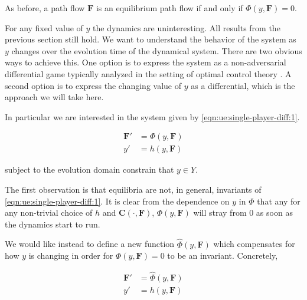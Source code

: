 As before, a path flow $\mathbf{F}$ is an equilibrium path flow if and only if $\Phi(y, \mathbf{F}) = 0$.

For any fixed value of $y$ the dynamics are uninteresting.
All results from the previous section still hold.
We want to understand the behavior of the system as $y$ changes over the evolution time of the dynamical system.
There are two obvious ways to achieve this.
One option is to express the system as a non-adversarial differential game typically analyzed in the setting of optimal control theory \citep{bardi2008optimal}.
A second option is to express the changing value of $y$ as a differential, which is the approach we will take here.

In particular we are interested in the system given by \eqref{eqn:ue:single-player-diff:1}.

\begin{subequations}
    \begin{align}
        \mathbf{F}' &= \Phi(y, \mathbf{F})\\ 
        y' &= h(y, \mathbf{F})
    \end{align}\label{eqn:ue:single-player-diff:1}
\end{subequations}

subject to the evolution domain constrain that $y\in Y$.

The first observation is that equilibria are not, in general, invariants of \eqref{eqn:ue:single-player-diff:1}.
It is clear from the dependence on $y$ in $\Phi$ that any for any non-trivial choice of $h$ and $\mathbf{C}(\cdot, \mathbf{F})$, $\Phi(y, \mathbf{F})$ will stray from 0 as soon as the dynamics start to run.

We would like instead to define a new function $\hat{\Phi}(y, \mathbf{F})$ which compensates for how $y$ is changing in order for $\Phi(y, \mathbf{F}) = 0$ to be an invariant. Concretely,

\begin{subequations}
    \begin{align}
        \mathbf{F}' &= \hat{\Phi}(y, \mathbf{F})\\ 
        y' &= h(y, \mathbf{F})
    \end{align}\label{eqn:ue:single-player-diff:2}
\end{subequations}